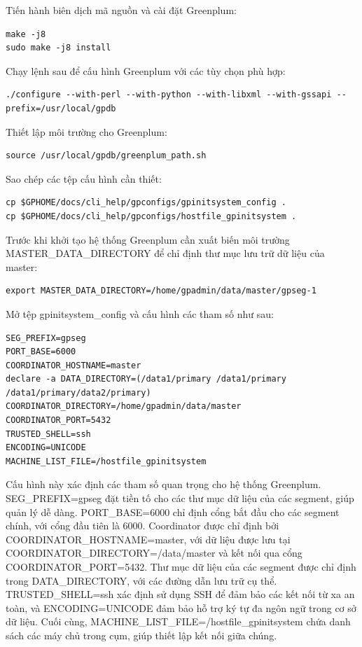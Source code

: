 \documentclass{article}[14pt]
\begin{document}
Tiến hành biên dịch mã nguồn và cài đặt Greenplum:

\begin{verbatim}
make -j8 
sudo make -j8 install
\end{verbatim}
Chạy lệnh sau để cấu hình Greenplum với các tùy chọn phù hợp:

\begin{verbatim}
./configure --with-perl --with-python --with-libxml --with-gssapi --prefix=/usr/local/gpdb
\end{verbatim}

Thiết lập môi trường cho Greenplum:


\begin{verbatim}
source /usr/local/gpdb/greenplum_path.sh
\end{verbatim}


Sao chép các tệp cấu hình cần thiết:

\begin{verbatim}
cp $GPHOME/docs/cli_help/gpconfigs/gpinitsystem_config .
cp $GPHOME/docs/cli_help/gpconfigs/hostfile_gpinitsystem .
\end{verbatim}

Trước khi khởi tạo hệ thống Greenplum cần xuất biến môi trường MASTER\_DATA\_DIRECTORY để chỉ định thư mục lưu trữ dữ liệu của master:


\begin{verbatim}
export MASTER_DATA_DIRECTORY=/home/gpadmin/data/master/gpseg-1
\end{verbatim}

Mở tệp gpinitsystem\_config và cấu hình các tham số như sau:

\begin{verbatim}
SEG_PREFIX=gpseg
PORT_BASE=6000
COORDINATOR_HOSTNAME=master
declare -a DATA_DIRECTORY=(/data1/primary /data1/primary /data1/primary/data2/primary)
COORDINATOR_DIRECTORY=/home/gpadmin/data/master
COORDINATOR_PORT=5432
TRUSTED_SHELL=ssh
ENCODING=UNICODE
MACHINE_LIST_FILE=/hostfile_gpinitsystem
\end{verbatim}

Cấu hình này xác định các tham số quan trọng cho hệ thống Greenplum. SEG\_PREFIX=gpseg đặt tiền tố cho các thư mục dữ liệu của các segment, giúp quản lý dễ dàng. PORT\_BASE=6000 chỉ định cổng bắt đầu cho các segment chính, với cổng đầu tiên là 6000. Coordinator được chỉ định bởi COORDINATOR\_HOSTNAME=master, với dữ liệu được lưu tại COORDINATOR\_DIRECTORY=/data/master và kết nối qua cổng COORDINATOR\_PORT=5432. Thư mục dữ liệu của các segment được chỉ định trong DATA\_DIRECTORY, với các đường dẫn lưu trữ cụ thể. TRUSTED\_SHELL=ssh xác định sử dụng SSH để đảm bảo các kết nối từ xa an toàn, và ENCODING=UNICODE đảm bảo hỗ trợ ký tự đa ngôn ngữ trong cơ sở dữ liệu. Cuối cùng, MACHINE\_LIST\_FILE=/hostfile\_gpinitsystem chứa danh sách các máy chủ trong cụm, giúp thiết lập kết nối giữa chúng.
\end{document}
